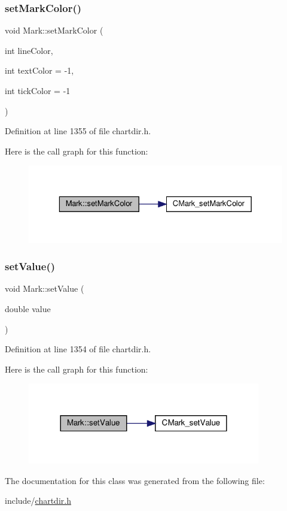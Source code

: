 \subsubsection{\texorpdfstring{set\+Mark\+Color()}{setMarkColor()}}
{\footnotesize\ttfamily void Mark\+::set\+Mark\+Color (\begin{DoxyParamCaption}\item[{int}]{line\+Color,  }\item[{int}]{text\+Color = {\ttfamily -\/1},  }\item[{int}]{tick\+Color = {\ttfamily -\/1} }\end{DoxyParamCaption})\hspace{0.3cm}{\ttfamily [inline]}}



Definition at line 1355 of file chartdir.\+h.

Here is the call graph for this function\+:
\nopagebreak
\begin{figure}[H]
\begin{center}
\leavevmode
\includegraphics[width=329pt]{class_mark_a61c1d13aaab343847f90d929158e7b77_cgraph}
\end{center}
\end{figure}
\mbox{\label{class_mark_ab1ba925b610ba216b79da27660553cfc}} 
\subsubsection{\texorpdfstring{set\+Value()}{setValue()}}
{\footnotesize\ttfamily void Mark\+::set\+Value (\begin{DoxyParamCaption}\item[{double}]{value }\end{DoxyParamCaption})\hspace{0.3cm}{\ttfamily [inline]}}



Definition at line 1354 of file chartdir.\+h.

Here is the call graph for this function\+:
\nopagebreak
\begin{figure}[H]
\begin{center}
\leavevmode
\includegraphics[width=288pt]{class_mark_ab1ba925b610ba216b79da27660553cfc_cgraph}
\end{center}
\end{figure}


The documentation for this class was generated from the following file\+:\begin{DoxyCompactItemize}
\item 
include/\hyperlink{chartdir_8h}{chartdir.\+h}\end{DoxyCompactItemize}
